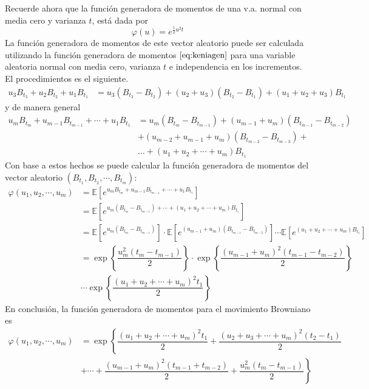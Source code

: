 \documentclass[11pt,notitlepage]{article}
\begin{document}
Recuerde ahora que la función generadora de momentos de una v.a. normal con media cero y varianza \(t\),  está dada por
\begin{equation}
    \label{eq:keniagen}
    \varphi(u)= e^{\frac{1}{2}u^2 t}
\end{equation}
La función generadora de momentos de este vector aleatorio puede ser calculada utilizando la función generadora de momentos $\eqref{eq:keniagen}$ para una variable aleatoria normal con media cero, varianza \(t\) e independencia en los incrementos. El procedimientos es el siguiente.
\begin{align*}
   u_3 B_{t_3} + u_2 B_{t_2} + u_1 B_{t_1} &= u_3 ( B_{t_3}-B_{t_2})+ (u_2+u_3) (B_{t_2}- B_{t_1}) + (u_1+u_2+u_3)B_{t_1} 
\end{align*}
y de manera general
\begin{align*}
 u_m B_{t_m} + u_{m-1} B_{t_{m-1}} + \cdots + u_1 B_{t_1} &= u_m ( B_{t_{m}}-B_{t_{m-1}})+ (u_{m-1}+u_m) (B_{t_{m-1}}- B_{t_{m-2}}) \\
 &+ (u_{m-2}+u_{m-1}+u_m)(B_{t_{m-2}}- B_{t_{m-3}}) + \\
 &\hdots+ (u_1+u_2+ \cdots + u_m)B_{t_1} 
\end{align*}
 Con base a estos hechos se puede calcular la función generadora de momentos del vector aleatorio $(B_{t_1}, B_{t_2}, \cdots, B_{t_m}): $
 \begin{align*}
     \varphi(u_1, u_2, \cdots, u_m) &= \mathbb{E}\left[ e^{u_mB_{t_m} + u_{m-1} B_{t_{m-1}}  + \cdots + u_1 B_{t_{1}}} \right] \\
                         &= \mathbb{E}\left[e^{u_m \left(B_{t_m} - B_{t_{m-1}}\right) + \cdots + (u_1+ u_2+ \cdots + u_m)B_{t_1}}\right] \\
                          &= \mathbb{E}\left[e^{u_m\left(B_{t_m} - B_{t_{m-1}}\right)}\right]\cdot \mathbb{E}\left[e^{(u_{m-1}+u_m)\left(B_{t_{m-1}} - B_{t_{m-2}}\right)}\right]\cdots \mathbb{E}\left[e^{(u_1+ u_2+ \cdots + u_m)B_{t_1}}\right]\\
                          &= \exp{\left\{\dfrac{u^2_m(t_m - t_{m-1})}{2} \right\}}\cdot\exp{\left\{\dfrac{(u_{m-1}+u_m)^2(t_{m-1}-t_{m-2})}{2}\right\}}\\
                          &\cdots \exp{\left\{\dfrac{(u_1+u_2 + \cdots + u_m)^2t_1}{2} \right\}}
 \end{align*}
 En conclusión, la función generadora de momentos para el movimiento Browniano es
 \begin{align*}
  \varphi(u_1, u_2, \cdots, u_m) 
  &= \exp{\left\{ \dfrac{(u_1+u_2+\cdots + u_m)^2t_1}{2} + \dfrac{(u_2+u_3 + \cdots + u_m)^2(t_2-t_1)}{2}   \right.}\\
  &\left.+ \cdots + \dfrac{(u_{m-1}+u_m)^2(t_{m-1}+t_{m-2})}{2}+\dfrac{u^2_m(t_m-t_{m-1})}{2}\right\}
 \end{align*}
\end{document}
